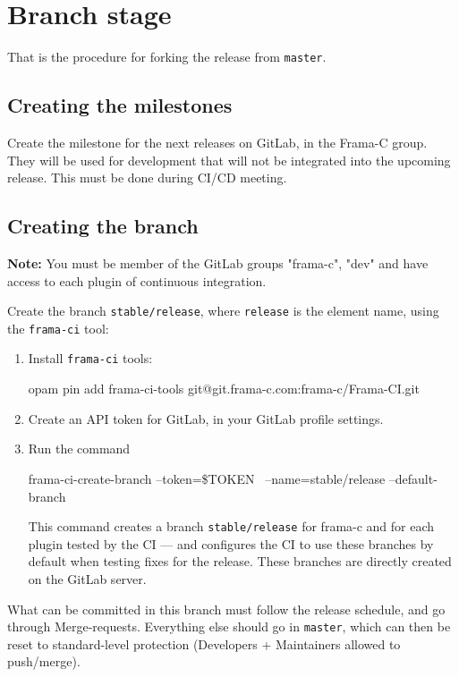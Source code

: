 \chapter{Branch stage}
\label{chap:branch}

That is the procedure for forking the release from \texttt{master}.

\section{Creating the milestones}
\label{sec:creating-milestones}

Create the milestone for the next releases on \textsf{GitLab}, in the Frama-C
group. They will be used for development that will not be integrated into the
upcoming release. This must be done during CI/CD meeting.

\section{Creating the branch}
\label{sec:creating-branch}

\textbf{Note:} You must be member of the GitLab groups "frama-c", "dev" and have
access to each plugin of continuous integration.

Create the branch \texttt{stable/release}, where \texttt{release} is the
element name, using the \texttt{frama-ci} tool:
\begin{enumerate}
\item Install \texttt{frama-ci} tools:
\begin{shell}
opam pin add frama-ci-tools git@git.frama-c.com:frama-c/Frama-CI.git
\end{shell}
\item Create an API token for GitLab, in your GitLab profile settings.
\item Run the command
\begin{shell}
frama-ci-create-branch --token=\$TOKEN \
--name=stable/release --default-branch
\end{shell}
This command creates a branch \texttt{stable/release} for frama-c and for
each plugin tested by the CI — and configures the CI to use these branches
by default when testing fixes for the release.
These branches are directly created on the GitLab server.
\end{enumerate}
What can be committed in this branch must follow the release schedule,
and go through Merge-requests. Everything else should go in \texttt{master},
which can then be reset to standard-level protection (Developers + Maintainers
allowed to push/merge).

